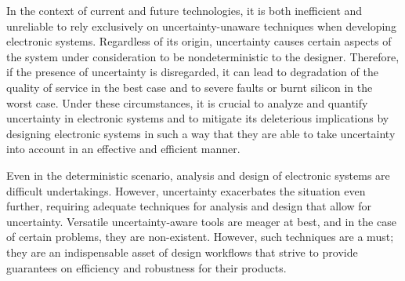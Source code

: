 In the context of current and future technologies, it is both inefficient and
unreliable to rely exclusively on uncertainty-unaware techniques when developing
electronic systems. Regardless of its origin, uncertainty causes certain aspects
of the system under consideration to be nondeterministic to the designer.
Therefore, if the presence of uncertainty is disregarded, it can lead to
degradation of the quality of service in the best case and to severe faults or
burnt silicon in the worst case. Under these circumstances, it is crucial to
analyze and quantify uncertainty in electronic systems and to mitigate its
deleterious implications by designing electronic systems in such a way that they
are able to take uncertainty into account in an effective and efficient manner.

Even in the deterministic scenario, analysis and design of electronic systems
are difficult undertakings. However, uncertainty exacerbates the situation even
further, requiring adequate techniques for analysis and design that allow for
uncertainty. Versatile uncertainty-aware tools are meager at best, and in the
case of certain problems, they are non-existent. However, such techniques are a
must; they are an indispensable asset of design workflows that strive to provide
guarantees on efficiency and robustness for their products.
